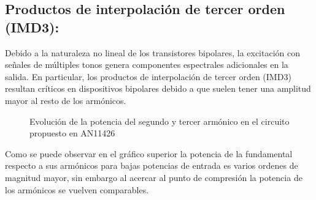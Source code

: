 \subsection{Productos de interpolación de tercer orden (IMD3):}
Debido a la naturaleza no lineal de los transistores bipolares, la excitación con señales de múltiples tonos genera componentes espectrales adicionales en la salida. En particular, los productos de interpolación de tercer orden (IMD3) resultan críticos en dispositivos bipolares debido a que suelen tener una amplitud mayor al resto de los armónicos.
\begin{figure}[htbp]
\centering
{}
\caption{Evolución de la potencia del segundo y tercer armónico en el circuito propuesto en AN11426}
\label{fig:nf_vs_freq}
\end{figure}
Como se puede observar en el gráfico superior la potencia de la fundamental respecto a sus armónicos para bajas potencias de entrada es varios ordenes de magnitud mayor, sin embargo al acercar al punto de compresión la potencia de los armónicos se vuelven comparables.
